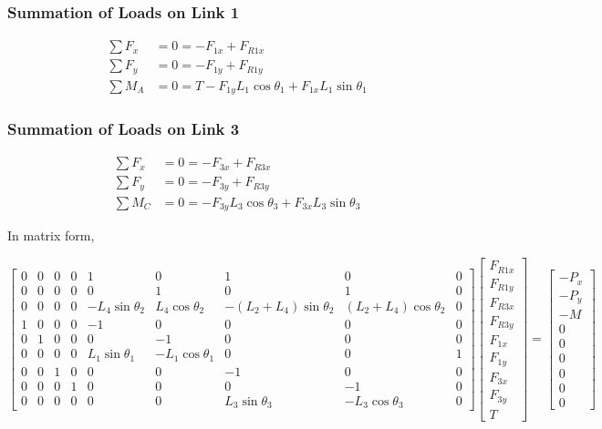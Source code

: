 \documentclass[letterpaper]{article}
\begin{document}
\subsubsection{Summation of Loads on Link 1}

\begin{align}
	\sum F_x &= 0 = -F_{1x} + F_{R1x} \\
	\sum F_y &= 0 = -F_{1y} + F_{R1y} \\
	\sum M_A &= 0 = T - F_{1y} L_1 \cos \theta_1 + F_{1x} L_1 \sin \theta_1
\end{align}

\subsubsection{Summation of Loads on Link 3}

\begin{align}
	\sum F_x &= 0 = -F_{3x} + F_{R3x} \\
	\sum F_y &= 0 = -F_{3y} + F_{R3y} \\
	\sum M_C &= 0 = - F_{3y} L_3 \cos \theta_3 + F_{3x} L_3 \sin \theta_3
\end{align}

\noindent In matrix form,

\begin{equation}
\begin{bmatrix}
0 & 0 & 0 & 0 & 1 & 0 & 1 & 0 &0 \\ 
0 & 0 & 0 & 0 & 0 & 1 & 0 & 1 &0 \\
0 & 0 & 0 & 0 &  -L_4 \sin \theta_2 &  L_4 \cos \theta_2& -(L_2 + L_4) \sin \theta_2 & (L_2 + L_4) \cos \theta_2 & 0 \\
1 & 0 & 0 & 0 & -1 & 0 & 0 & 0 & 0 \\
0 & 1 & 0 & 0 & 0 & -1 & 0 & 0 & 0 \\
0 & 0 & 0 & 0 & L_1 \sin \theta_1 & -L_1 \cos \theta_1 & 0 & 0 & 1\\
0 & 0 & 1 & 0 & 0 & 0 & -1 & 0 & 0 \\
0 & 0 & 0 & 1 & 0 & 0 & 0 & -1 & 0 \\
0 & 0 & 0 & 0 & 0 & 0 & L_3 \sin \theta_3 & -L_3 \cos \theta_3 & 0
\end{bmatrix}
\begin{bmatrix} F_{R1x} \\ F_{R1y} \\ F_{R3x} \\ F_{R3y} \\ F_{1x} \\ F_{1y} \\ F_{3x} \\ F_{3y} \\ T \end{bmatrix}
=
\begin{bmatrix} -P_x \\ - P_y \\ -M \\ 0 \\ 0 \\ 0 \\ 0 \\ 0 \\ 0 \end{bmatrix}
\end{equation}
\end{document}
